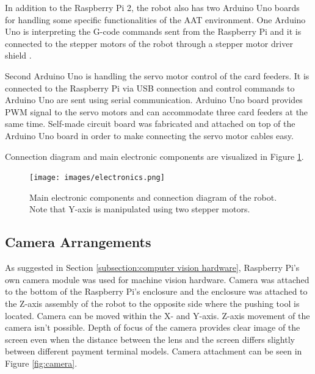 In addition to the Raspberry Pi 2, the robot also has two Arduino Uno boards for handling some specific functionalities of the AAT environment. One Arduino Uno is interpreting the G-code commands sent from the Raspberry Pi and it is connected to the stepper motors of the robot through a stepper motor driver shield \emph{\citep{grbl_shield}}.

Second Arduino Uno is handling the servo motor control of the card feeders. It is connected to the Raspberry Pi via USB connection and control commands to Arduino Uno are sent using serial communication. Arduino Uno board provides PWM signal to the servo motors and can accommodate three card feeders at the same time. Self-made circuit board was fabricated and attached on top of the Arduino Uno board in order to make connecting the servo motor cables easy.

Connection diagram and main electronic components are visualized in Figure \ref{fig:electronics}.

\begin{figure}[ht]
  \begin{center}
    \texttt{[image: images/electronics.png]}
    \caption{Main electronic components and connection diagram of the robot. Note that Y-axis is manipulated using two stepper motors.}
    \label{fig:electronics}
  \end{center}
\end{figure}
\FloatBarrier

\subsection{Camera Arrangements}
\label{subsection:Camera Arrangements}

As suggested in Section \ref{subsection:computer vision hardware}, Raspberry Pi's own camera module was used for machine vision hardware. Camera was attached to the bottom of the Raspberry Pi's enclosure and the enclosure was attached to the Z-axis assembly of the robot to the opposite side where the pushing tool is located. Camera can be moved within the X- and Y-axis. Z-axis movement of the camera isn't possible. Depth of focus of the camera provides clear image of the screen even when the distance between the lens and the screen differs slightly between different payment terminal models. Camera attachment can be seen in Figure \ref{fig:camera}.

